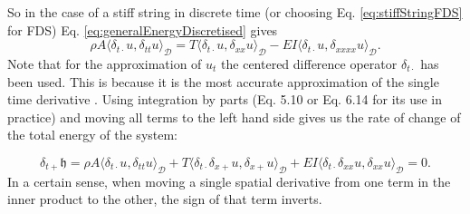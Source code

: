 \documentclass{article}
\begin{document}
So in the case of a stiff string in discrete time (or choosing Eq. \eqref{eq:stiffStringFDS} for FDS) Eq. \eqref{eq:generalEnergyDiscretised} gives
\begin{equation}
     \rho A \langle \delta_{t\cdot}u, \delta_{tt} u\rangle_\mathcal{D} = T \langle \delta_{t\cdot}u, \delta_{xx}u\rangle_\mathcal{D} - EI \langle \delta_{t\cdot}u, \delta_{xxxx}u \rangle_\mathcal{D}.
\end{equation}
Note that for the approximation of $u_t$ the centered difference operator $\delta_{t\cdot}$ has been used. This is because it is the most accurate approximation of the single time derivative \cite{Bilbao2009}. Using integration by parts (Eq. 5.10 or Eq. 6.14 for its use in practice) and moving all terms to the left hand side gives us the rate of change of the total energy of the system:

\begin{equation}\label{eq:stiffStringEnergy}
     \delta_{t+}\mathfrak{h} = \rho A \langle \delta_{t\cdot}u, \delta_{tt} u\rangle_\mathcal{D} + T \langle \delta_{t\cdot}\delta_{x+}u, \delta_{x+}u\rangle_\mathcal{D} + EI \langle \delta_{t\cdot}\delta_{xx}u, \delta_{xx}u \rangle_\mathcal{D} = 0.
\end{equation}
In a certain sense, when moving a single spatial derivative from one term in the inner product to the other, the sign of that term inverts.
\end{document}
